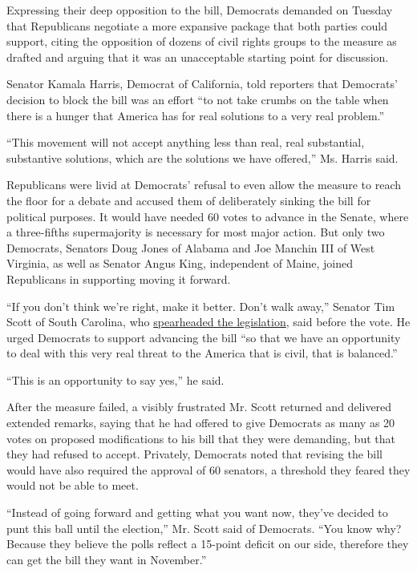 Expressing their deep opposition to the bill, Democrats demanded on
Tuesday that Republicans negotiate a more expansive package that both
parties could support, citing the opposition of dozens of civil rights
groups to the measure as drafted and arguing that it was an unacceptable
starting point for discussion.

Senator Kamala Harris, Democrat of California, told reporters that
Democrats' decision to block the bill was an effort ``to not take crumbs
on the table when there is a hunger that America has for real solutions
to a very real problem.''

``This movement will not accept anything less than real, real
substantial, substantive solutions, which are the solutions we have
offered,'' Ms. Harris said.

Republicans were livid at Democrats' refusal to even allow the measure
to reach the floor for a debate and accused them of deliberately sinking
the bill for political purposes. It would have needed 60 votes to
advance in the Senate, where a three-fifths supermajority is necessary
for most major action. But only two Democrats, Senators Doug Jones of
Alabama and Joe Manchin III of West Virginia, as well as Senator Angus
King, independent of Maine, joined Republicans in supporting moving it
forward.

``If you don't think we're right, make it better. Don't walk away,''
Senator Tim Scott of South Carolina, who
\href{https://www.nytimes.com/2020/06/16/us/politics/tim-scott-police-protests.html}{spearheaded
the legislation}, said before the vote. He urged Democrats to support
advancing the bill ``so that we have an opportunity to deal with this
very real threat to the America that is civil, that is balanced.''

``This is an opportunity to say yes,'' he said.

After the measure failed, a visibly frustrated Mr. Scott returned and
delivered extended remarks, saying that he had offered to give Democrats
as many as 20 votes on proposed modifications to his bill that they were
demanding, but that they had refused to accept. Privately, Democrats
noted that revising the bill would have also required the approval of 60
senators, a threshold they feared they would not be able to meet.

``Instead of going forward and getting what you want now, they've
decided to punt this ball until the election,'' Mr. Scott said of
Democrats. ``You know why? Because they believe the polls reflect a
15-point deficit on our side, therefore they can get the bill they want
in November.''

